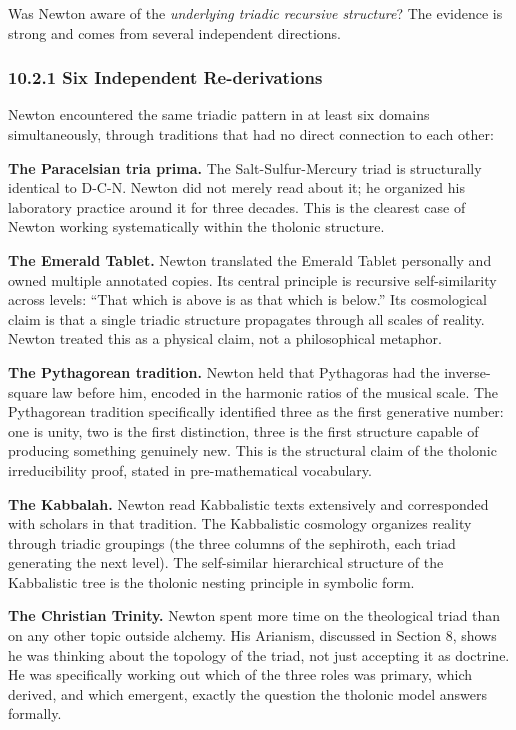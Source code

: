 \documentclass[12pt]{article}
\begin{document}
Was Newton aware of the \emph{underlying triadic recursive structure}?
The evidence is strong and comes from several independent directions.

\subsubsection{10.2.1 Six Independent
Re-derivations}\label{six-independent-re-derivations}

Newton encountered the same triadic pattern in at least six domains
simultaneously, through traditions that had no direct connection to each
other:

\textbf{The Paracelsian tria prima.} The Salt-Sulfur-Mercury triad is
structurally identical to D-C-N. Newton did not merely read about it; he
organized his laboratory practice around it for three decades. This is
the clearest case of Newton working systematically within the tholonic
structure.

\textbf{The Emerald Tablet.} Newton translated the Emerald Tablet
personally and owned multiple annotated copies. Its central principle is
recursive self-similarity across levels: ``That which is above is as
that which is below.'' Its cosmological claim is that a single triadic
structure propagates through all scales of reality. Newton treated this
as a physical claim, not a philosophical metaphor.

\textbf{The Pythagorean tradition.} Newton held that Pythagoras had the
inverse-square law before him, encoded in the harmonic ratios of the
musical scale. The Pythagorean tradition specifically identified three
as the first generative number: one is unity, two is the first
distinction, three is the first structure capable of producing something
genuinely new. This is the structural claim of the tholonic
irreducibility proof, stated in pre-mathematical vocabulary.

\textbf{The Kabbalah.} Newton read Kabbalistic texts extensively and
corresponded with scholars in that tradition. The Kabbalistic cosmology
organizes reality through triadic groupings (the three columns of the
sephiroth, each triad generating the next level). The self-similar
hierarchical structure of the Kabbalistic tree is the tholonic nesting
principle in symbolic form.

\textbf{The Christian Trinity.} Newton spent more time on the
theological triad than on any other topic outside alchemy. His Arianism,
discussed in Section 8, shows he was thinking about the topology of the
triad, not just accepting it as doctrine. He was specifically working
out which of the three roles was primary, which derived, and which
emergent, exactly the question the tholonic model answers formally.
\end{document}
